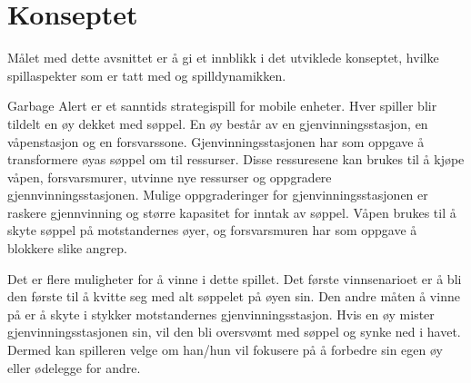 \section{Konseptet}\label{sec:konsept}
Målet med dette avsnittet er å gi et innblikk i det utviklede konseptet,
hvilke spillaspekter som er tatt med og spilldynamikken.

Garbage Alert er et sanntids strategispill for mobile enheter. Hver
spiller blir tildelt en øy dekket med søppel. En øy består av en
gjenvinningsstasjon, en våpenstasjon og en forsvarssone.
Gjenvinningsstasjonen har som oppgave å transformere øyas søppel om til
ressurser. Disse ressuresene kan brukes til å kjøpe våpen,
forsvarsmurer, utvinne nye ressurser og oppgradere
gjennvinningsstasjonen. Mulige oppgraderinger for gjenvinningsstasjonen
er raskere gjennvinning og større kapasitet for inntak av søppel. Våpen
brukes til å skyte søppel på motstandernes øyer, og forsvarsmuren har
som oppgave å blokkere slike angrep. 

Det er flere muligheter for å vinne i dette spillet. Det første
vinnsenarioet er å bli den første til å kvitte seg med alt søppelet på
øyen sin. Den andre måten å vinne på er å skyte i stykker motstandernes
gjenvinningsstasjon. Hvis en øy mister gjenvinningsstasjonen sin, vil
den bli oversvømt med søppel og synke ned i havet. Dermed kan spilleren
velge om han/hun vil fokusere på å forbedre sin egen øy eller ødelegge
for andre. 
